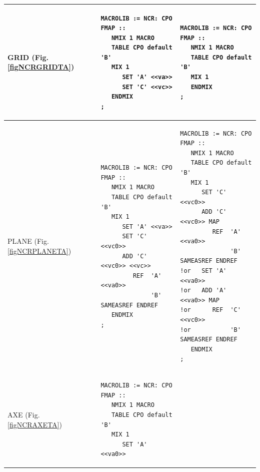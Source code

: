 \begin{center}
\tablelasttail{\hline}

\begin{supertabular}{|p{0.1\textwidth}|p{0.4\textwidth}|p{0.4\textwidth}|}
\hline
GRID (Fig. \ref{figNCRGRIDTA}) & 
\begin{verbatim}
MACROLIB := NCR: CPO FMAP ::
   NMIX 1 MACRO 
   TABLE CPO default 'B' 
   MIX 1 
      SET 'A' <<va>>
      SET 'C' <<vc>>
   ENDMIX
;
\end{verbatim} &
\begin{verbatim}
MACROLIB := NCR: CPO FMAP ::
   NMIX 1 MACRO 
   TABLE CPO default 'B' 
   MIX 1 
   ENDMIX
;
\end{verbatim} \\
\hline
PLANE (Fig. \ref{figNCRPLANETA}) & 
\begin{verbatim}
MACROLIB := NCR: CPO FMAP ::
   NMIX 1 MACRO 
   TABLE CPO default 'B' 
   MIX 1 
      SET 'A' <<va>>
      SET 'C' <<vc0>>
      ADD 'C' <<vc0>> <<vc>>
         REF  'A' <<va0>> 
              'B' SAMEASREF ENDREF
   ENDMIX
;
\end{verbatim} &
\begin{verbatim}
MACROLIB := NCR: CPO FMAP ::
   NMIX 1 MACRO 
   TABLE CPO default 'B' 
   MIX 1 
      SET 'C' <<vc0>>
      ADD 'C' <<vc0>> MAP
         REF  'A' <<va0>> 
              'B' SAMEASREF ENDREF
!or   SET 'A' <<va0>>
!or   ADD 'A' <<va0>> MAP
!or      REF  'C' <<vc0>> 
!or           'B' SAMEASREF ENDREF
   ENDMIX
;
\end{verbatim} \\
\hline
AXE (Fig. \ref{figNCRAXETA}) & 
\begin{verbatim}
MACROLIB := NCR: CPO FMAP ::
   NMIX 1 MACRO 
   TABLE CPO default 'B' 
   MIX 1 
      SET 'A' <<va0>>

\end{verbatim}
\end{supertabular}
\end{center}
